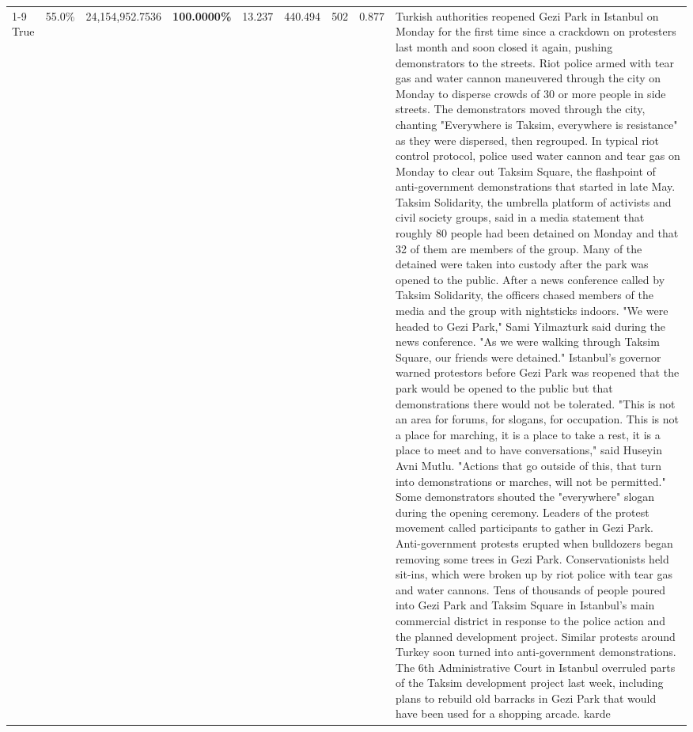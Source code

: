 \begin{table}[H]
\begin{tabular}{lllrlllll}
\cline{1-9}
True & 55.0\% & 24,154,952.7536 & \bfseries \color{red} 100.0000\% & 13.237 & 440.494 & 502 & 0.877 & Turkish authorities reopened Gezi Park in Istanbul on Monday for the first time since a crackdown on protesters last month and soon closed it again, pushing demonstrators to the streets. Riot police armed with tear gas and water cannon maneuvered through the city on Monday to disperse crowds of 30 or more people in side streets. The demonstrators moved through the city, chanting "Everywhere is Taksim, everywhere is resistance" as they were dispersed, then regrouped. In typical riot control protocol, police used water cannon and tear gas on Monday to clear out Taksim Square, the flashpoint of anti-government demonstrations that started in late May. Taksim Solidarity, the umbrella platform of activists and civil society groups, said in a media statement that roughly 80 people had been detained on Monday and that 32 of them are members of the group. Many of the detained were taken into custody after the park was opened to the public. After a news conference called by Taksim Solidarity, the officers chased members of the media and the group with nightsticks indoors. "We were headed to Gezi Park," Sami Yilmazturk said during the news conference. "As we were walking through Taksim Square, our friends were detained." Istanbul's governor warned protestors before Gezi Park was reopened that the park would be opened to the public but that demonstrations there would not be tolerated. "This is not an area for forums, for slogans, for occupation. This is not a place for marching, it is a place to take a rest, it is a place to meet and to have conversations," said Huseyin Avni Mutlu. "Actions that go outside of this, that turn into demonstrations or marches, will not be permitted." Some demonstrators shouted the "everywhere" slogan during the opening ceremony. Leaders of the protest movement called participants to gather in Gezi Park. Anti-government protests erupted when bulldozers began removing some trees in Gezi Park. Conservationists held sit-ins, which were broken up by riot police with tear gas and water cannons. Tens of thousands of people poured into Gezi Park and Taksim Square in Istanbul's main commercial district in response to the police action and the planned development project. Similar protests around Turkey soon turned into anti-government demonstrations. The 6th Administrative Court in Istanbul overruled parts of the Taksim development project last week, including plans to rebuild old barracks in Gezi Park that would have been used for a shopping arcade. karde \\

\end{tabular}
\end{table}
